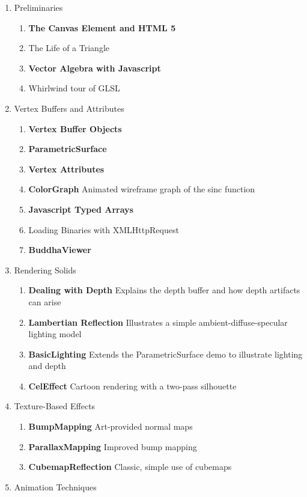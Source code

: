 \setcounter{recipei}{0}
\newcommand{\verbiage}[2] {\item \textbf{\textcolor{commentgreen}{#1}} \footnotesize#2\normalsize}
\newcommand{\rrecipe}[2] {\item \textbf{\textcolor{commentgreen}{#1}} \footnotesize#2\normalsize}
\newcommand{\irecipe}[2] {\item \textbf{\textcolor{commentgreen}{#1}} \footnotesize#2\normalsize}
\newcommand{\arecipe}[2] {\item \textbf{\textcolor{commentgreen}{#1}} \footnotesize#2\normalsize}
\renewcommand{\labelenumi}{}
\begin{enumerate}

\item Preliminaries
\begin{enumerate}[resume]
\verbiage{The Canvas Element and HTML 5}
\verbiage{The Life of a Triangle}
\verbiage{Vector Algebra with Javascript}
\verbiage{Whirlwind tour of GLSL}
\end{enumerate}
%
\item Vertex Buffers and Attributes
\begin{enumerate}[resume]
\verbiage{Vertex Buffer Objects}{}
\rrecipe{ParametricSurface}{}
\verbiage{Vertex Attributes}{}
\rrecipe{ColorGraph}{Animated wireframe graph of the sinc function} %
\verbiage{Javascript Typed Arrays}
\verbiage{Loading Binaries with XMLHttpRequest}
\rrecipe{BuddhaViewer}{}
\end{enumerate}
%
\item Rendering Solids
\begin{enumerate}[resume]
\verbiage{Dealing with Depth}{Explains the depth buffer and how depth artifacts can arise}
\verbiage{Lambertian Reflection}{Illustrates a simple ambient-diffuse-specular lighting model}
\rrecipe{BasicLighting}{Extends the ParametricSurface demo to illustrate lighting and depth}
\rrecipe{CelEffect}{Cartoon rendering with a two-pass silhouette}
\end{enumerate}
%
\item Texture-Based Effects
\begin{enumerate}[resume]
\rrecipe{BumpMapping}{Art-provided normal maps} %
\rrecipe{ParallaxMapping}{Improved bump mapping}
\rrecipe{CubemapReflection}{Classic, simple use of cubemaps} %
\end{enumerate}
%
\item Animation Techniques
\begin{enumerate}[resume]

\end{enumerate}
\end{enumerate}
